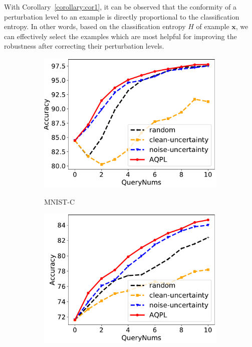 \documentclass[letterpaper]{article} %
\begin{document}
With Corollary~\ref{corollary:cor1}, it can be observed that the conformity of a perturbation level to an example is directly proportional to the classification entropy. In other words, based on the classification entropy $H$ of example $\mathbf{x}$, we can effectively select the examples which are most helpful for improving the robustness after correcting their perturbation levels.


\begin{figure}[!t]
	\centering

	\begin{subfigure}{0.3\linewidth}
		\centering
		\label{fig.Mnist.Gaussian}
		\includegraphics[width=1\textwidth]{img/Resnet18-Mnist-GuassianNoise.pdf}\\
		\caption{MNIST-C}
	\end{subfigure}
	\begin{subfigure}{0.3\linewidth}
		\centering
		\label{fig.Cifar10.Gaussian}
		\includegraphics[width=1\textwidth]{img/Resnet18-CIFAR10-GuassianNoise.pdf}\\

\end{subfigure}
\end{figure}
\end{document}
